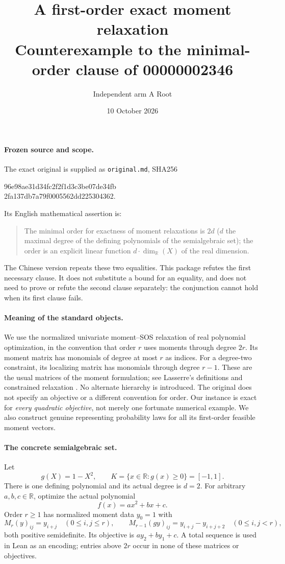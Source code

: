 \documentclass[11pt]{article}
\title{A first-order exact moment relaxation\\Counterexample to the minimal-order clause of 00000002346}
\author{Independent arm A Root}
\date{10 October 2026}
\newcommand{\R}{\mathbb R}
\begin{document}
\maketitle

\paragraph{Frozen source and scope.}
The exact original is supplied as \texttt{original.md}, SHA256
\begin{center}\small\ttfamily
96e98ae31d34fc2f2f1d3c3be07de34fb\\
2fa137db7a79f0005562dd225304362.
\end{center}
Its English mathematical assertion is:
\begin{quote}
The minimal order for exactness of moment relaxations is $2d$ ($d$ the maximal degree of the defining polynomials of the semialgebraic set); the order is an explicit linear function $d\cdot\dim_{\R}(X)$ of the real dimension.
\end{quote}
The Chinese version repeats these two equalities. This package refutes the first necessary clause. It does not substitute a bound for an equality, and does not need to prove or refute the second clause separately: the conjunction cannot hold when its first clause fails.

\paragraph{Meaning of the standard objects.}
We use the normalized univariate moment--SOS relaxation of real polynomial optimization, in the convention that order $r$ uses moments through degree $2r$. Its moment matrix has monomials of degree at most $r$ as indices. For a degree-two constraint, its localizing matrix has monomials through degree $r-1$. These are the usual matrices of the moment formulation; see Lasserre's definitions and constrained relaxation \cite{lasserre}. No alternate hierarchy is introduced.
The original does not specify an objective or a different convention for order. Our instance is exact for \emph{every quadratic objective}, not merely one fortunate numerical example. We also construct genuine representing probability laws for all its first-order feasible moment vectors.

\paragraph{The concrete semialgebraic set.}
Let
\[
g(X)=1-X^2,\qquad K=\{x\in\R:g(x)\geq0\}=[-1,1].
\]
There is one defining polynomial and its actual degree is $d=2$. For arbitrary $a,b,c\in\R$, optimize the actual polynomial
\[
f(x)=ax^2+bx+c.
\]
Order $r\geq1$ has normalized moment data $y_0=1$ with
\[
M_r(y)_{ij}=y_{i+j}\quad(0\leq i,j\leq r),\qquad
M_{r-1}(g y)_{ij}=y_{i+j}-y_{i+j+2}\quad(0\leq i,j<r),
\]
both positive semidefinite. Its objective is $a y_2+b y_1+c$. A total sequence is used in Lean as an encoding; entries above $2r$ occur in none of these matrices or objectives.
\end{document}
